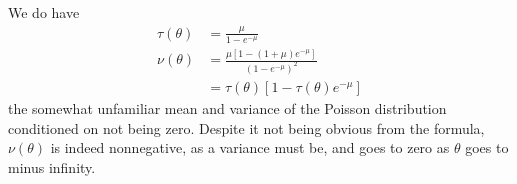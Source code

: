 We do have
\begin{align*}
   \tau(\theta) & = \frac{\mu}{1 - e^{- \mu}}
   \\
   \nu(\theta) & = \frac{\mu [1 - (1 + \mu) e^{- \mu}]}{(1 - e^{- \mu})^2}
   \\
   & = \tau(\theta) [ 1 - \tau(\theta) e^{- \mu} ]
\end{align*}
the somewhat unfamiliar mean and variance of the Poisson distribution
conditioned on not being zero.
Despite it not being obvious from the formula, $\nu(\theta)$ is indeed
nonnegative, as a variance must be, and goes to zero as $\theta$ goes
to minus infinity.

